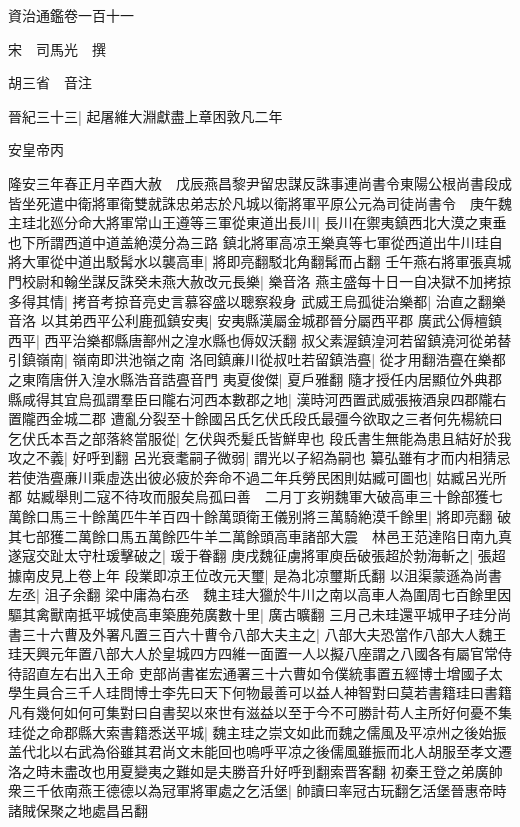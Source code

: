 資治通鑑卷一百十一

宋　司馬光　撰

胡三省　音注

晉紀三十三|{
	起屠維大淵獻盡上章困敦凡二年}


安皇帝丙

隆安三年春正月辛酉大赦　戊辰燕昌黎尹留忠謀反誅事連尚書令東陽公根尚書段成皆坐死遣中衛將軍衛雙就誅忠弟志於凡城以衛將軍平原公元為司徒尚書令　庚午魏主珪北廵分命大將軍常山王遵等三軍從東道出長川|{
	長川在禦夷鎮西北大漠之東垂也下所謂西道中道盖絶漠分為三路}
鎮北將軍高凉王樂真等七軍從西道出牛川珪自將大軍從中道出駁髯水以襲高車|{
	將即亮翻駁北角翻髯而占翻}
壬午燕右將軍張真城門校尉和翰坐謀反誅癸未燕大赦改元長樂|{
	樂音洛}
燕主盛每十日一自决獄不加拷掠多得其情|{
	拷音考掠音亮史言慕容盛以聰察殺身}
武威王烏孤徙治樂都|{
	治直之翻樂音洛}
以其弟西平公利鹿孤鎮安夷|{
	安夷縣漢屬金城郡晉分屬西平郡}
廣武公傉檀鎮西平|{
	西平治樂都縣唐鄯州之湟水縣也傉奴沃翻}
叔父素渥鎮湟河若留鎮澆河從弟替引鎮嶺南|{
	嶺南即洪池嶺之南}
洛囘鎮亷川從叔吐若留鎮浩亹|{
	從才用翻浩亹在樂都之東隋唐併入湟水縣浩音誥亹音門}
夷夏俊傑|{
	夏戶雅翻}
隨才授任内居顯位外典郡縣咸得其宜烏孤謂羣臣曰隴右河西本數郡之地|{
	漢時河西置武威張掖酒泉四郡隴右置隴西金城二郡}
遭亂分裂至十餘國呂氏乞伏氏段氏最彊今欲取之三者何先楊統曰乞伏氏本吾之部落終當服從|{
	乞伏與禿髪氏皆鮮卑也}
段氏書生無能為患且結好於我攻之不義|{
	好呼到翻}
呂光衰耄嗣子微弱|{
	謂光以子紹為嗣也}
纂弘雖有才而内相猜忌若使浩亹亷川乘虛迭出彼必疲於奔命不過二年兵勞民困則姑臧可圖也|{
	姑臧呂光所都}
姑臧舉則二寇不待攻而服矣烏孤曰善　二月丁亥朔魏軍大破高車三十餘部獲七萬餘口馬三十餘萬匹牛羊百四十餘萬頭衛王儀别將三萬騎絶漠千餘里|{
	將即亮翻}
破其七部獲二萬餘口馬五萬餘匹牛羊二萬餘頭高車諸部大震　林邑王范達陷日南九真遂寇交趾太守杜瑗擊破之|{
	瑗于眷翻}
庚戌魏征虜將軍庾岳破張超於勃海斬之|{
	張超據南皮見上卷上年}
段業即凉王位改元天璽|{
	是為北凉璽斯氏翻}
以沮渠蒙遜為尚書左丞|{
	沮子余翻}
梁中庸為右丞　魏主珪大獵於牛川之南以高車人為圍周七百餘里因驅其禽獸南抵平城使高車築鹿苑廣數十里|{
	廣古曠翻}
三月己未珪還平城甲子珪分尚書三十六曹及外署凡置三百六十曹令八部大夫主之|{
	八部大夫恐當作八部大人魏王珪天興元年置八部大人於皇城四方四維一面置一人以擬八座謂之八國各有屬官常侍待詔直左右出入王命}
吏部尚書崔宏通署三十六曹如令僕統事置五經博士增國子太學生員合三千人珪問博士李先曰天下何物最善可以益人神智對曰莫若書籍珪曰書籍凡有幾何如何可集對曰自書契以來世有滋益以至于今不可勝計苟人主所好何憂不集珪從之命郡縣大索書籍悉送平城|{
	魏主珪之崇文如此而魏之儒風及平凉州之後始振盖代北以右武為俗雖其君尚文未能回也嗚呼平凉之後儒風雖振而北人胡服至孝文遷洛之時未盡改也用夏變夷之難如是夫勝音升好呼到翻索晋客翻}
初秦王登之弟廣帥衆三千依南燕王德德以為冠軍將軍處之乞活堡|{
	帥讀曰率冠古玩翻乞活堡晉惠帝時諸賊保聚之地處昌呂翻}
